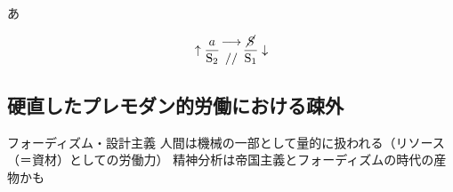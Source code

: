 あ

\[
\uparrow\frac{a}{\mathrm{S_2}}\genfrac{}{}{0pt}{}{\longrightarrow}{//}\frac{\mathrm{\cancel{S}}}{\mathrm{S_1}}\downarrow
\]

\subsection{硬直したプレモダン的労働における疎外}\label{ux786cux76f4ux3057ux305fux30d7ux30ecux30e2ux30c0ux30f3ux7684ux52b4ux50cdux306bux304aux3051ux308bux758eux5916}

フォーディズム・設計主義
人間は機械の一部として量的に扱われる（リソース（＝資材）としての労働力）
精神分析は帝国主義とフォーディズムの時代の産物かも
